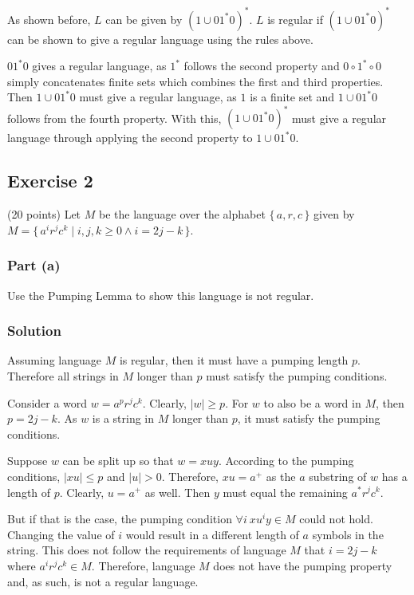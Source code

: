 \documentclass[12pt]{article}
\begin{document}
As shown before, $L$ can be given by ${(1 \cup 01^{*}0)}^{*}$. $L$ is regular if ${(1 \cup 01^{*}0)}^{*}$ can be shown to give a regular language using the rules above.

$0 1^{*} 0$ gives a regular language, as $1^{*}$ follows the second property and $0 \circ 1^{*} \circ 0$ simply concatenates finite sets which combines the first and third properties.
Then $1 \cup 0 1^{*} 0$ must give a regular language, as $1$ is a finite set and $1 \cup 0 1^{*} 0$ follows from the fourth property.
With this, ${(1 \cup 01^{*}0)}^{*}$ must give a regular language through applying the second property to $1 \cup 0 1^{*} 0$.

\pagebreak

\subsection*{Exercise 2}

(20 points) Let $M$ be the language over the alphabet $\{\,a, r, c\,\}$ given by \sloppy${M=\{\,a^{i}r^{j}c^{k} \mid i,j,k \ge 0 \land i = 2j - k\,\}}$.

\subsubsection*{Part (a)}

Use the Pumping Lemma to show this language is not regular.

\subsubsection*{Solution}

Assuming language $M$ is regular, then it must have a pumping length $p$.
Therefore all strings in $M$ longer than $p$ must satisfy the pumping conditions.

Consider a word $w = a^{p} r^{j} c^{k}$. Clearly, $|w| \geq p$. For $w$ to also be a word in $M$, then $p = 2j - k$.
As $w$ is a string in $M$ longer than $p$, it must satisfy the pumping conditions.

Suppose $w$ can be split up so that $w = xuy$. According to the pumping conditions, $|xu| \leq p$ and $|u| > 0$.
Therefore, $xu = a^{+}$ as the $a$ substring of $w$ has a length of $p$. Clearly, $u = a^{+}$ as well.
Then $y$ must equal the remaining $a^{*}r^{j} c^{k}$.

But if that is the case, the pumping condition $\forall i\ xu^{i}y \in M$ could not hold.
Changing the value of $i$ would result in a different length of $a$ symbols in the string.
This does not follow the requirements of language $M$ that $i = 2j - k$ where $a^{i} r^{j} c^{k} \in M$.
Therefore, language $M$ does not have the pumping property and, as such, is not a regular language.
\end{document}
